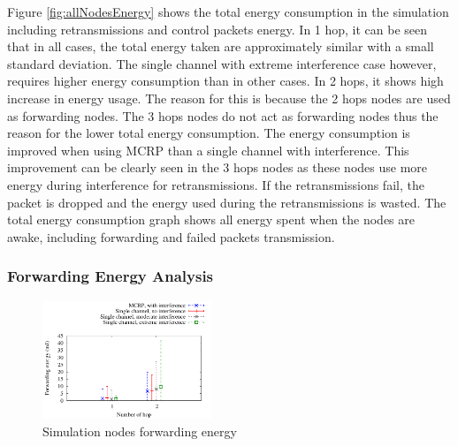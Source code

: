 Figure \ref{fig:allNodesEnergy} shows the total energy consumption in the simulation including retransmissions and control packets energy. 
In 1 hop, it can be seen that in all cases, the total energy taken are approximately similar with a small standard deviation. The single channel with extreme interference case however, requires higher energy consumption than in other cases.
In 2 hops, it shows high increase in energy usage. The reason for this is because the 2 hops nodes are used as forwarding nodes. The 3 hops nodes do not act as forwarding nodes thus the reason for the lower total energy consumption.
The energy consumption is improved when using MCRP than a single channel with interference. This improvement can be clearly seen in the 3 hops nodes as these nodes use more energy during interference for retransmissions. If the retransmissions fail, the packet is dropped and the energy used during the retransmissions is wasted. The total energy consumption graph shows all energy spent when the nodes are awake, including forwarding and failed packets transmission.

\subsubsection{Forwarding Energy Analysis}

\begin{figure}
\centering
\includegraphics[width=0.45\textwidth]{figures/fwdEnergy.pdf}
\caption{Simulation nodes forwarding energy}
\label{fig:allNodesFwdEnergy}
\end{figure}

